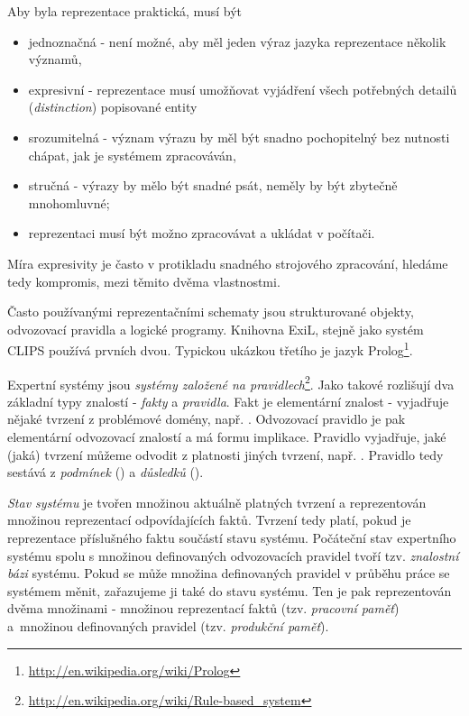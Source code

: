 Aby byla reprezentace praktická, musí být
\begin{itemize}
  \item jednoznačná - není možné, aby měl jeden výraz jazyka reprezentace
    několik významů,
  \item expresivní - reprezentace musí umožňovat vyjádření všech potřebných
    detailů (\emph{distinction}) popisované entity
  \item srozumitelná - význam výrazu by měl být snadno pochopitelný bez
    nutnosti chápat, jak je systémem zpracováván,
  \item stručná - výrazy by mělo být snadné psát, neměly by být zbytečně
    mnohomluvné;
  \item reprezentaci musí být možno zpracovávat a ukládat v počítači.
\end{itemize}
Míra expresivity je často v protikladu snadného strojového zpracování, hledáme
tedy kompromis, mezi těmito dvěma vlastnostmi.

Často používanými reprezentačními schematy jsou strukturované objekty,
odvozovací pravidla a logické programy. Knihovna ExiL, stejně jako systém CLIPS
používá prvních dvou. Typickou ukázkou třetího je jazyk
Prolog\footnote{\url{http://en.wikipedia.org/wiki/Prolog}}.

Expertní systémy jsou \emph{systémy založené na
pravidlech}\footnote{\url{http://en.wikipedia.org/wiki/Rule-based\_system}}.
Jako takové rozlišují dva základní typy znalostí - \emph{fakty} a
\emph{pravidla}. Fakt je elementární  znalost - vyjadřuje nějaké
tvrzení z problémové domény, např. . Odvozovací pravidlo je
pak elementární odvozovací znalostí a má formu implikace. Pravidlo vyjadřuje,
jaké (jaká) tvrzení můžeme odvodit z platnosti jiných tvrzení, např. . Pravidlo tedy sestává z \emph{podmínek} () a \emph{důsledků} ().

\emph{Stav systému} je tvořen množinou aktuálně platných tvrzení a reprezentován
množinou reprezentací odpovídajících faktů. Tvrzení tedy platí, pokud je
reprezentace příslušného faktu součástí stavu systému. Počáteční stav
expertního systému spolu s množinou definovaných odvozovacích pravidel tvoří
tzv. \emph{znalostní bázi} systému. Pokud se může množina definovaných pravidel
v průběhu práce se systémem měnit, zařazujeme ji také do stavu systému. Ten je
pak reprezentován dvěma množinami - množinou reprezentací faktů (tzv.
\emph{pracovní paměť}) a~množinou definovaných pravidel (tzv. \emph{produkční
paměť}).

